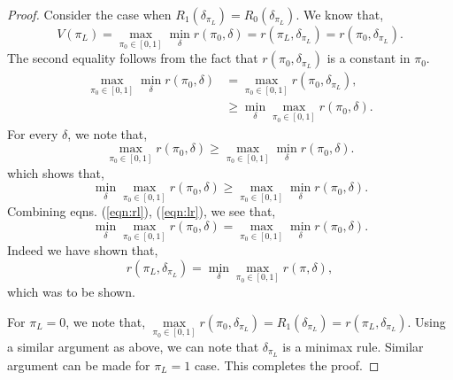 \documentclass[a4paper,english,12pt]{article}
\begin{document}
\begin{proof}
Consider the case when $R_1(\delta_{\pi_L})=R_0(\delta_{\pi_L})$. We know that, 
\begin{equation}
V(\pi_L)=\mathop {\max }\limits_{{\pi _0} \in [0,1]} \mathop {\min }\limits_\delta  r({\pi _0},\delta ) = r({\pi _L},{\delta _{{\pi _L}}})=r({\pi _0},{\delta _{{\pi _L}}}).
\end{equation}
The second equality follows from the fact that $r(\pi_0,\delta_{\pi_L})$ is a constant in $\pi_0$.
\begin{align}\label{eqn:rl}
\mathop {\max }\limits_{{\pi _0} \in [0,1]} \mathop {\min }\limits_\delta  r({\pi _0},\delta ) &= \mathop {\max }\limits_{{\pi _0} \in [0,1]} r({\pi _0},{\delta _{{\pi _L}}}), \\\nonumber
&\ge \mathop {\min }\limits_\delta  \mathop {\max }\limits_{{\pi _0} \in [0,1]} r({\pi _0},\delta ).
\end{align}
For every $\delta$, we note that,
\begin{equation}
\mathop {\max }\limits_{{\pi _0} \in [0,1]} r({\pi _0},\delta ) \ge \mathop {\max }\limits_{{\pi _0} \in [0,1]} \mathop {\min }\limits_\delta  r({\pi _0},\delta ).
\end{equation}
which shows that,
\begin{equation}\label{eqn:lr}
\mathop {\min }\limits_{\delta} \mathop {\max }\limits_{{\pi _0} \in [0,1]} r({\pi _0},\delta ) \ge \mathop {\max }\limits_{{\pi _0} \in [0,1]} \mathop {\min }\limits_\delta  r({\pi _0},\delta ).
\end{equation}
Combining eqns. (\ref{eqn:rl}), (\ref{eqn:lr}), we see that,
\begin{equation}
\mathop {\min }\limits_{\delta} \mathop {\max }\limits_{{\pi _0} \in [0,1]} r({\pi _0},\delta ) = \mathop {\max }\limits_{{\pi _0} \in [0,1]} \mathop {\min }\limits_\delta  r({\pi _0},\delta ).
\end{equation}
Indeed we have shown that, 
\begin{equation}
r({\pi _L},{\delta _{{\pi _L}}}) = \mathop {\min }\limits_\delta  \mathop {\max }\limits_{{\pi _0} \in [0,1]} r(\pi ,\delta ),
\end{equation}
which was to be shown.
\par For $\pi_L=0$, we note that, $\mathop {\max }\limits_{{\pi _0} \in [0,1]} r(\pi_0,\delta_{\pi_L})=R_1(\delta_{\pi_L})=r(\pi_L,\delta_{\pi_L})$. Using a similar argument as above, we can note that $\delta_{\pi_L}$ is a minimax rule. Similar argument can be made for $\pi_L=1$ case. This completes the proof.
\end{proof}
\end{document}
